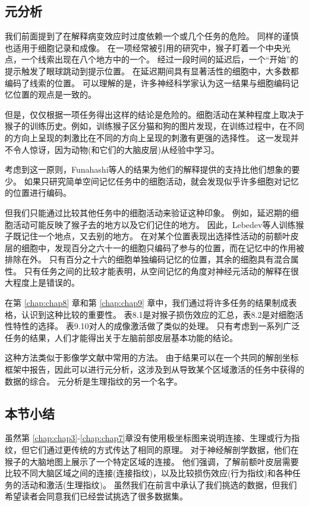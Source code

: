 \subsection{元分析}
我们前面提到了在解释病变效应时过度依赖一个或几个任务的危险。
同样的谨慎也适用于细胞记录和成像。
在一项经常被引用的研究中\cite{funahashi1989mnemonic}，猴子盯着一个中央光点，一个线索出现在八个地方中的一个。
经过一段时间的延迟后，一个“开始”的提示触发了眼球跳动到提示位置。
在延迟期间具有显著活性的细胞中，大多数都编码了线索的位置。
可以理解的是，许多神经科学家认为这一结果与细胞编码记忆位置的观点是一致的。


\par
但是，仅仅根据一项任务得出这样的结论是危险的。细胞活动在某种程度上取决于猴子的训练历史。例如，训练猴子区分猫和狗的图片发现\cite{freedman2006experience}，在训练过程中，在不同的方向上呈现的刺激比在不同的方向上呈现的刺激有更强的选择性。
这一发现并不令人惊讶，因为动物(和它们的大脑皮层)从经验中学习。

\par
考虑到这一原则，Funahashi等人\cite{funahashi1989mnemonic}的结果为他们的解释提供的支持比他们想象的要少。
如果只研究简单空间记忆任务中的细胞活动，就会发现似乎许多细胞对记忆的位置进行编码。


\par
但我们只能通过比较其他任务中的细胞活动来验证这种印象。
例如，延迟期的细胞活动可能反映了猴子去的地方以及它们记住的地方。
因此，Lebedev等人\cite{lebedev2004representation}训练猴子既记住一个地点，又去别的地方。
在对某个位置表现出选择性活动的前额叶皮层的细胞中，发现百分之六十一的细胞只编码了参与的位置，而在记忆中的作用被排除在外。
只有百分之十六的细胞单独编码记忆的位置，其余的细胞具有混合属性。
只有任务之间的比较才能表明，从空间记忆的角度对神经元活动的解释在很大程度上是错误的。


\par
在第 \ref{chap:chap8} 章和第 \ref{chap:chap9} 章中，我们通过将许多任务的结果制成表格，认识到这种比较的重要性。
表8.1是对猴子损伤效应的汇总，表8.2是对细胞活性特性的选择。
表9.10对人的成像激活做了类似的处理。
只有考虑到一系列广泛任务的结果，人们才能得出关于左脑前部皮层基本功能的结论。

\par
这种方法类似于影像学文献中常用的方法。
由于结果可以在一个共同的解剖坐标框架中报告，因此可以进行元分析，这涉及到从导致某个区域激活的任务中获得的数据的综合。
元分析是生理指纹的另一个名字。


\subsection{本节小结}
虽然第 \ref{chap:chap3}-\ref{chap:chap7}章没有使用极坐标图来说明连接、生理或行为指纹，但它们通过更传统的方式传达了相同的原理。
对于神经解剖学数据，他们在猴子的大脑地图上展示了一个特定区域的连接。
他们强调，了解前额叶皮层需要比较不同大脑区域之间的连接(连接指纹)，以及比较损伤效应(行为指纹)和各种任务的活动和激活(生理指纹)。
虽然我们在前言中承认了我们挑选的数据，但我们希望读者会同意我们已经尝试挑选了很多数据集。

